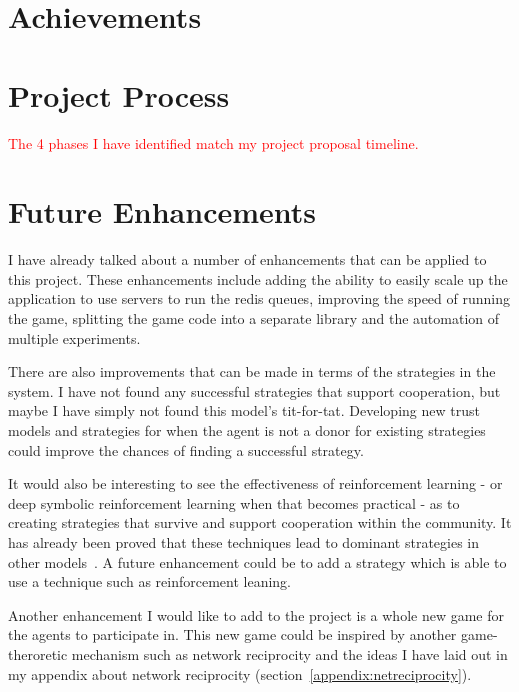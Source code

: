 \documentclass[]{final_report}
\begin{document}
\section{Achievements}


\section{Project Process}
\textcolor{red}{The 4 phases I have identified match my project proposal timeline.}

\section{Future Enhancements}
I have already talked about a number of enhancements that can be applied to this project. These enhancements include adding the ability to easily scale up the application to use servers to run the redis queues, improving the speed of running the game, splitting the game code into a separate library and the automation of multiple experiments.\par 
There are also improvements that can be made in terms of the strategies in the system. I have not found any successful strategies that support cooperation, but maybe I have simply not found this model's tit-for-tat. Developing new trust models and strategies for when the agent is not a donor for existing strategies could improve  the chances of finding a successful strategy.\par 
It would also be interesting to see the effectiveness of reinforcement learning - or deep symbolic reinforcement learning when that becomes practical - as to creating strategies that survive and support cooperation within the community. It has already been proved that these techniques lead to dominant strategies in other models~\cite{harper2017reinforcement}. A future enhancement could be to add a strategy which is able to use a technique such as reinforcement leaning.\par 
Another enhancement I would like to add to the project is a whole new game for the agents to participate in. This new game could be inspired by another game-theroretic mechanism such as network reciprocity and the ideas I have laid out in my appendix about network reciprocity (section~\ref{appendix:netreciprocity}).
\end{document}
